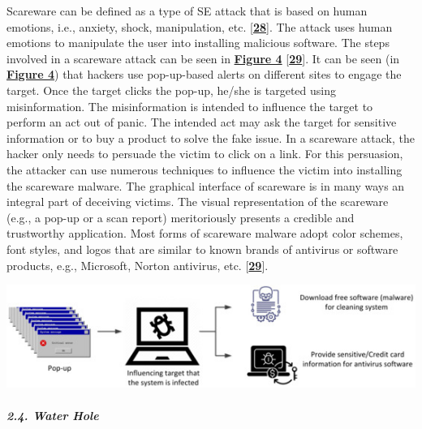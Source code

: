 Scareware can be defined as a type of SE attack that is based on human emotions, i.e., anxiety, shock, manipulation, etc. [\href{https://www.mdpi.com/2076-3417/12/12/6042\#B28-applsci-12-06042}{\textbf{28}}]. The attack uses human emotions to manipulate the user into installing malicious software. The steps involved in a scareware attack can be seen in \href{https://www.mdpi.com/2076-3417/12/12/6042\#fig_body_display_applsci-12-06042-f004}{\textbf{Figure 4}} [\href{https://www.mdpi.com/2076-3417/12/12/6042\#B29-applsci-12-06042}{\textbf{29}}]. It can be seen (in \href{https://www.mdpi.com/2076-3417/12/12/6042\#fig_body_display_applsci-12-06042-f004}{\textbf{Figure 4}}) that hackers use pop-up-based alerts on different sites to engage the target. Once the target clicks the pop-up, he/she is targeted using misinformation. The misinformation is intended to influence the target to perform an act out of panic. The intended act may ask the target for sensitive information or to buy a product to solve the fake issue. In a scareware attack, the hacker only needs to persuade the victim to click on a link. For this persuasion, the attacker can use numerous techniques to influence the victim into installing the scareware malware. The graphical interface of scareware is in many ways an integral part of deceiving victims. The visual representation of the scareware (e.g., a pop-up or a scan report) meritoriously presents a credible and trustworthy application. Most forms of scareware malware adopt color schemes, font styles, and logos that are similar to known brands of antivirus or software products, e.g., Microsoft, Norton antivirus, etc. [\href{https://www.mdpi.com/2076-3417/12/12/6042\#B29-applsci-12-06042}{\textbf{29}}].


     \includegraphics[width=0.75\linewidth]{scareware.png}
     \label{fig:placeholder}
 
\paragraph{\textit{2.4. Water Hole}}

